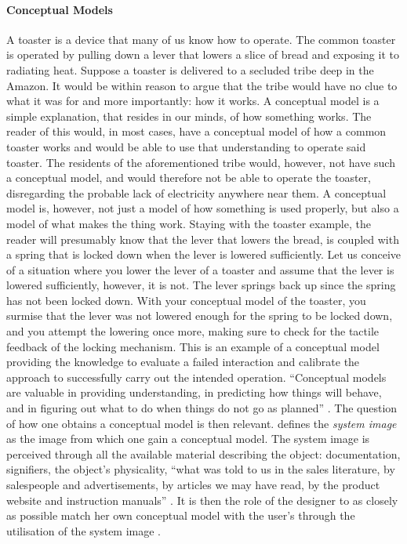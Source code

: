\paragraph{Conceptual Models} A toaster is a device that many of us know how to operate. The common toaster is operated by pulling down a lever that lowers a slice of bread and exposing it to radiating heat. Suppose a toaster is delivered to a secluded tribe deep in the Amazon. It would be within reason to argue that the tribe would have no clue to what it was for and more importantly: how it works. A conceptual model is a simple explanation, that resides in our minds, of how something works. The reader of this would, in most cases, have a conceptual model of how a common toaster works and would be able to use that understanding to operate said toaster. The residents of the aforementioned tribe would, however, not have such a conceptual model, and would therefore not be able to operate the toaster, disregarding the probable lack of electricity anywhere near them. A conceptual model is, however, not just a model of how something is used properly, but also a model of what makes the thing work. Staying with the toaster example, the reader will presumably know that the lever that lowers the bread, is coupled with a spring that is locked down when the lever is lowered sufficiently. Let us conceive of a situation where you lower the lever of a toaster and assume that the lever is lowered sufficiently, however, it is not. The lever springs back up since the spring has not been locked down. With your conceptual model of the toaster, you surmise that the lever was not lowered enough for the spring to be locked down, and you attempt the lowering once more, making sure to check for the tactile feedback of the locking mechanism. This is an example of a conceptual model providing the knowledge to evaluate a failed interaction and calibrate the approach to successfully carry out the intended operation. ``Conceptual models are valuable in providing understanding, in predicting how things will behave, and in figuring out what to do when things do not go as planned'' \cite[p. 28]{norman}. The question of how one obtains a conceptual model is then relevant.  defines the \textit{system image} as the image from which one gain a conceptual model. The system image is perceived through all the available material describing the object: documentation, signifiers, the object's physicality, ``what was told to us in the sales literature, by salespeople and advertisements, by articles we may have read, by the product website and instruction manuals'' \cite[p. 31]{norman}. It is then the role of the designer to as closely as possible match her own conceptual model with the user's through the utilisation of the system image \cite{norman}.

\newpage
